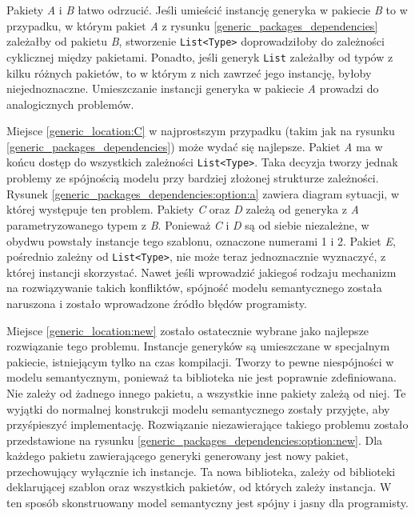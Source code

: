 Pakiety \emph{A} i \emph{B} łatwo odrzucić.
Jeśli umieścić instancję generyka w pakiecie \emph{B} to w przypadku, w którym pakiet \emph{A} z rysunku \ref{generic_packages_dependencies} zależałby od pakietu \emph{B}, stworzenie \lstinline{List<Type>} doprowadziłoby do zależności cyklicznej między pakietami.
Ponadto, jeśli generyk \lstinline{List} zależałby od typów z kilku różnych pakietów, to w którym z nich zawrzeć jego instancję, byłoby niejednoznaczne.
Umieszczanie instancji generyka w pakiecie \emph{A} prowadzi do analogicznych problemów.

Miejsce \ref{generic_location:C} w najprostszym przypadku (takim jak na rysunku \ref{generic_packages_dependencies}) może wydać się najlepsze.
Pakiet \emph{A} ma w końcu dostęp do wszystkich zależności \lstinline{List<Type>}.
Taka decyzja tworzy jednak problemy ze spójnością modelu przy bardziej złożonej strukturze zależności.
Rysunek \ref{generic_packages_dependencies:option:a} zawiera diagram sytuacji, w której występuje ten problem.
Pakiety \emph{C} oraz \emph{D} zależą od generyka z \emph{A} parametryzowanego typem z \emph{B}.
Ponieważ \emph{C} i \emph{D} są od siebie niezależne, w obydwu powstały instancje tego szablonu, oznaczone numerami 1 i 2.
Pakiet \emph{E}, pośrednio zależny od \lstinline{List<Type>}, nie może teraz jednoznacznie wyznaczyć, z której instancji skorzystać.
Nawet jeśli wprowadzić jakiegoś rodzaju mechanizm na rozwiązywanie takich konfliktów, spójność modelu semantycznego została naruszona i zostało wprowadzone źródło błędów programisty.

Miejsce \ref{generic_location:new} zostało ostatecznie wybrane jako najlepsze rozwiązanie tego problemu.
Instancje generyków są umieszczane w specjalnym pakiecie, istniejącym tylko na czas kompilacji.
Tworzy to pewne niespójności w modelu semantycznym, ponieważ ta biblioteka nie jest poprawnie zdefiniowana.
Nie zależy od żadnego innego pakietu, a wszystkie inne pakiety zależą od niej.
Te wyjątki do normalnej konstrukcji modelu semantycznego zostały przyjęte, aby przyśpieszyć implementację.
Rozwiązanie niezawierające takiego problemu zostało przedstawione na rysunku \ref{generic_packages_dependencies:option:new}.
Dla każdego pakietu zawierającego generyki generowany jest nowy pakiet, przechowujący wyłącznie ich instancje.
Ta nowa biblioteka, zależy od biblioteki deklarującej szablon oraz wszystkich pakietów, od których zależy instancja.
W ten sposób skonstruowany model semantyczny jest spójny i jasny dla programisty.


